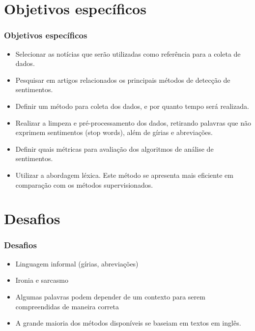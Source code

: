 \documentclass{beamer}
\begin{document}
\section{Objetivos específicos}
\begin{frame}%
\frametitle{\textbf{Objetivos específicos}\transdissolve}%
\begin{itemize}%
\item<1->Selecionar as notícias que serão utilizadas como referência para a coleta de
dados.
\item<2->Pesquisar em artigos relacionados os principais métodos de detecção de sentimentos.
\item<3->Definir um método para coleta dos dados, e por quanto tempo será realizada.
\item<4->Realizar a limpeza e pré-processamento dos dados, retirando palavras que não exprimem sentimentos (stop words), além de gírias e abreviações.
\item<5->Definir quais métricas para avaliação dos algoritmos de análise de sentimentos.
\item<6->Utilizar a abordagem léxica. Este método se apresenta mais eficiente em comparação com os métodos supervisionados. 

\end{itemize}
\end{frame}

\section{Desafios}
\begin{frame}%
\frametitle{\textbf{Desafios}\transdissolve}%
\begin{itemize}%
\item<1->Linguagem informal (gírias, abreviações)
\item<2->Ironia e sarcasmo
\item<3->Algumas palavras podem depender de um contexto para serem compreendidas de maneira correta
\item<4->A grande maioria dos métodos disponíveis se baseiam em textos em inglês.

\end{itemize}
\end{frame}
\end{document}
